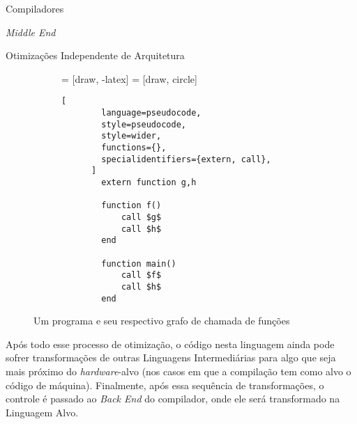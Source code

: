 \begin{section}{Compiladores}
\begin{subsection}{\textit{Middle End}}
\begin{subsubsection}{Otimizações Independente de Arquitetura}
\begin{figure}[ht]
\centering
  \begin{subfigure}[b]{0.40\textwidth}
     = [draw, -latex]
     = [draw, circle]
    \begin{center}
    \end{center}
  \end{subfigure}
  \begin{subfigure}[b]{0.40\textwidth}
      \begin{lstlisting}[
        language=pseudocode,
        style=pseudocode,
        style=wider,
        functions={},
        specialidentifiers={extern, call},
      ]
        extern function g,h

        function f()
            call $g$
            call $h$
        end

        function main()
            call $f$
            call $h$
        end
      \end{lstlisting}
  \end{subfigure}
  \caption{Um programa e seu respectivo grafo de chamada de funções}
  \label{fig:call_graph}
\end{figure}

    Após todo esse processo de otimização, o código nesta linguagem ainda
pode sofrer transformações de outras Linguagens
Intermediárias para algo que seja mais próximo do
\textit{hardware}-alvo (nos casos em que a compilação tem como alvo o código de máquina).
Finalmente, após essa sequência de transformações, o controle é
passado ao \textit{Back End} do compilador, onde ele será transformado na
Linguagem Alvo.

\end{subsubsection}


\end{subsection}
\end{section}
